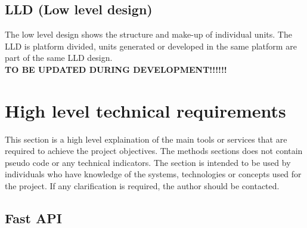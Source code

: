 \documentclass{article}
\begin{document}
 \subsection{LLD (Low level design)}
 The low level design shows the structure and make-up of individual units. The LLD is platform divided, units generated or developed in the same platform are part of the same LLD design.\\
 \textbf{TO BE UPDATED DURING DEVELOPMENT!!!!!!}


\section{High level technical requirements}
This section is a high level explaination of the main tools or services that are required to achieve the project objectives. The methods sections does not contain pseudo code or any technical
indicators. The section is intended to be used by individuals who have knowledge of the systems, technologies or concepts used for the project. If any clarification is required, the
author should be contacted.

\subsection{Fast API}
\end{document}

